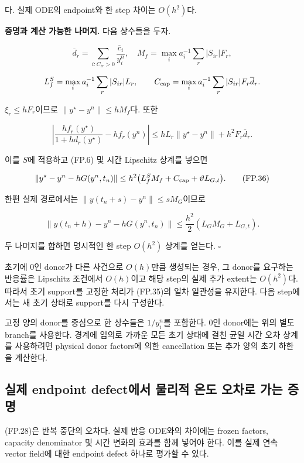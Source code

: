다. 실제 ODE의 endpoint와 한 step 차이는 \(O(h^2)\)다.

\textbf{증명과 계산 가능한 나머지.} 다음 상수들을 두자.

\[
\overline d_r=\sum_{i:C_{ir}>0}\frac{\overline c_i}{y_i^n},\quad
M_f=\max_i a_i^{-1}\sum_r|S_{ir}|F_r,
\]

\[
L_f^S=\max_i a_i^{-1}\sum_r|S_{ir}|L_r,\qquad
C_{\rm cap}=\max_i a_i^{-1}\sum_r|S_{ir}|F_r\overline d_r .
\]

\(\xi_r\le hF_r\)이므로 \(\|y^\star-y^n\|\le hM_f\)다. 또한

\[
\left|
\frac{hf_r(y^\star)}{1+hd_r(y^\star)}
-hf_r(y^n)
\right|
\le
hL_r\|y^\star-y^n\|+h^2F_r\overline d_r.
\]

이를 \(S\)에 적용하고 (FP.6) 및 시간 Lipschitz 상계를 넣으면

\[
\|y^\star-y^n-hG(y^n,t_n)\|
\le
h^2\bigl(L_f^S M_f+C_{\rm cap}
+\vartheta L_{G,t}\bigr).
\tag{FP.36}
\]

한편 실제 경로에서는 \(\|y(t_n+s)-y^n\|\le sM_G\)이므로

\[
\|y(t_n+h)-y^n-hG(y^n,t_n)\|
\le
\frac{h^2}{2}(L_GM_G+L_{G,t}).
\tag{FP.37}
\]

두 나머지를 합하면 명시적인 한 step \(O(h^2)\) 상계를 얻는다. \(\square\)

초기에 0인 donor가 다른 사건으로 \(O(h)\)만큼 생성되는 경우, 그 donor를 요구하는 반응률은 Lipschitz 조건에서 \(O(h)\)이고 해당 step의 실제 추가 extent는 \(O(h^2)\)다. 따라서 초기 support를 고정한 처리가 (FP.35)의 일차 일관성을 유지한다. 다음 step에서는 새 초기 상태로 support를 다시 구성한다.

고정 양의 donor를 중심으로 한 상수들은 \(1/y_i^n\)를 포함한다. 0인 donor에는 위의 별도 branch를 사용한다. 경계에 임의로 가까운 모든 초기 상태에 걸친 균일 시간 오차 상계를 사용하려면 physical donor factors에 의한 cancellation 또는 추가 양의 초기 하한을 계산한다.

\hypertarget{uxc2e4uxc81c-endpoint-defectuxc5d0uxc11c-uxbb3cuxb9acuxc801-uxc628uxb3c4-uxc624uxcc28uxb85c-uxac00uxb294-uxc99duxba85}{%
\subsection{실제 endpoint defect에서 물리적 온도 오차로 가는 증명}\label{uxc2e4uxc81c-endpoint-defectuxc5d0uxc11c-uxbb3cuxb9acuxc801-uxc628uxb3c4-uxc624uxcc28uxb85c-uxac00uxb294-uxc99duxba85}}

(FP.28)은 반복 중단의 오차다. 실제 반응 ODE와의 차이에는 frozen factors, capacity denominator 및 시간 변화의 효과를 함께 넣어야 한다. 이를 실제 연속 vector field에 대한 endpoint defect 하나로 평가할 수 있다.

